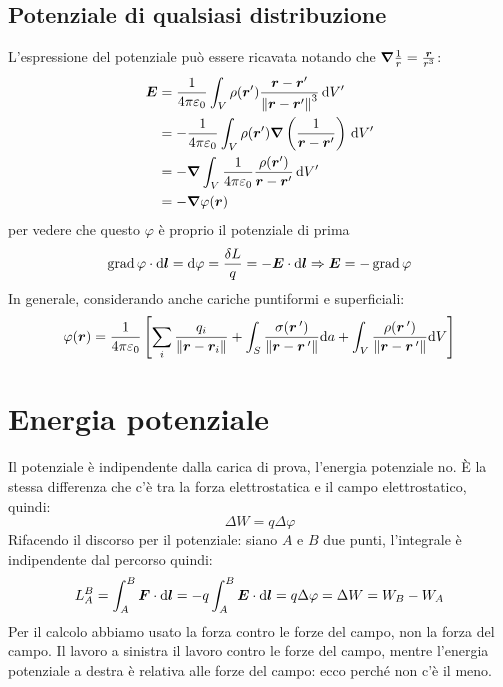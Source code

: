 \subsection{Potenziale di qualsiasi distribuzione}
L'espressione del potenziale può essere ricavata notando che $\boldsymbol{\nabla}\frac{1}{r}=\frac{\boldsymbol{r}}{r^3}$:
\begin{equation}
\begin{split}
 \boldsymbol{E} &= \frac{1}{4\pi\varepsilon_0}\int_V \rho(\boldsymbol{r}')\frac{\boldsymbol{r}-\boldsymbol{r}'}{\left\lVert\boldsymbol{r}-\boldsymbol{r}'\right\rVert^3}\,\mathrm{d} V'\\
&=-\frac{1}{4\pi\varepsilon_0}\int_V \rho(\boldsymbol{r}')\boldsymbol{\nabla}\left(\frac{1}{\boldsymbol{r}-\boldsymbol{r}'}\right)\,\mathrm{d} V'\\
&=-\boldsymbol{\nabla}\int_V \frac{1}{4\pi\varepsilon_0}\frac{\rho(\boldsymbol{r}')}{\boldsymbol{r}-\boldsymbol{r}'}\,\mathrm{d} V'\\
&=-\boldsymbol{\nabla}\varphi(\boldsymbol{r})
\end{split}
\end{equation}
per vedere che questo $\varphi$ è proprio il potenziale di prima
\begin{equation*}
\operatorname{grad} \varphi\cdot\mathrm{d}\boldsymbol{l}=\mathrm{d} \varphi=\frac{\delta L}{q}=-\boldsymbol{E}\cdot\mathrm{d} \boldsymbol{l}\Rightarrow \boldsymbol{E}=-\operatorname{grad}\varphi
\end{equation*}
In generale, considerando anche cariche puntiformi e superficiali:
\begin{equation}\varphi(\boldsymbol{r})=\frac{1}{4\pi\varepsilon_0}\left[\sum_i\frac{q_i}{\left\lVert\boldsymbol{r}-\boldsymbol{r}_i\right\rVert}+\int_S\frac{\sigma({\boldsymbol{r}}\,')}{\left\lVert\boldsymbol{r}-\boldsymbol{r}\,'\right\rVert}\mathrm{d} a+\int_V\frac{\rho({\boldsymbol{r}}\,')}{\left\lVert\boldsymbol{r}-{\boldsymbol{r}}\,'\right\rVert}\mathrm{d} V\right]\end{equation}
\section{Energia potenziale}
Il potenziale è indipendente dalla carica di prova, l'energia potenziale no. \`E la stessa differenza che c'è tra la forza elettrostatica e il campo elettrostatico, quindi:
\begin{equation*}\Delta W=q\Delta \varphi\end{equation*}
Rifacendo il discorso per il potenziale: siano $A$ e $B$ due punti, l'integrale è indipendente dal percorso quindi:
\begin{equation*}L_A^B=\int_A^B \boldsymbol{F}\cdot\mathrm{d}\boldsymbol{l}=-q\int_A^B\boldsymbol{E}\cdot\mathrm{d}\boldsymbol{l}=q\Delta \varphi=\Delta W=W_B-W_A\end{equation*}
Per il calcolo abbiamo usato la forza contro le forze del campo, non la forza del campo. Il lavoro a sinistra il lavoro contro le forze del campo, mentre l'energia potenziale a destra è relativa alle forze del campo: ecco perché non c'è il meno.
